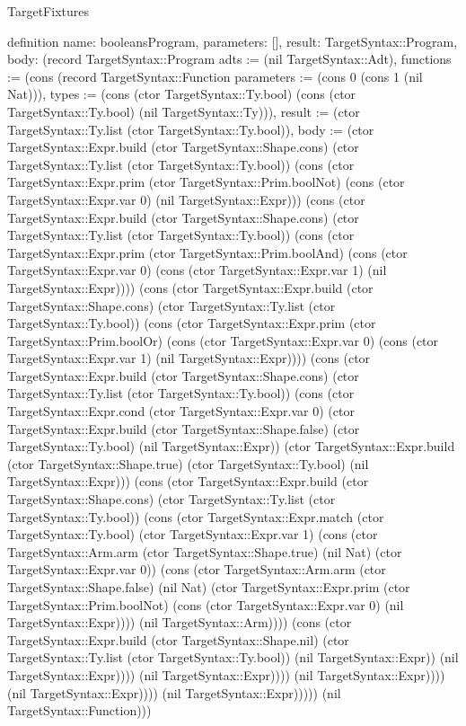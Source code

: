 \begin{lexlean}{TargetFixtures}
\begin{semanticmodule}
definition{
  name: booleansProgram,
  parameters: [],
  result: TargetSyntax::Program,
  body: (record TargetSyntax::Program {adts := (nil TargetSyntax::Adt), functions := (cons (record TargetSyntax::Function {parameters := (cons 0 (cons 1 (nil Nat))), types := (cons (ctor TargetSyntax::Ty.bool) (cons (ctor TargetSyntax::Ty.bool) (nil TargetSyntax::Ty))), result := (ctor TargetSyntax::Ty.list (ctor TargetSyntax::Ty.bool)), body := (ctor TargetSyntax::Expr.build (ctor TargetSyntax::Shape.cons) (ctor TargetSyntax::Ty.list (ctor TargetSyntax::Ty.bool)) (cons (ctor TargetSyntax::Expr.prim (ctor TargetSyntax::Prim.boolNot) (cons (ctor TargetSyntax::Expr.var 0) (nil TargetSyntax::Expr))) (cons (ctor TargetSyntax::Expr.build (ctor TargetSyntax::Shape.cons) (ctor TargetSyntax::Ty.list (ctor TargetSyntax::Ty.bool)) (cons (ctor TargetSyntax::Expr.prim (ctor TargetSyntax::Prim.boolAnd) (cons (ctor TargetSyntax::Expr.var 0) (cons (ctor TargetSyntax::Expr.var 1) (nil TargetSyntax::Expr)))) (cons (ctor TargetSyntax::Expr.build (ctor TargetSyntax::Shape.cons) (ctor TargetSyntax::Ty.list (ctor TargetSyntax::Ty.bool)) (cons (ctor TargetSyntax::Expr.prim (ctor TargetSyntax::Prim.boolOr) (cons (ctor TargetSyntax::Expr.var 0) (cons (ctor TargetSyntax::Expr.var 1) (nil TargetSyntax::Expr)))) (cons (ctor TargetSyntax::Expr.build (ctor TargetSyntax::Shape.cons) (ctor TargetSyntax::Ty.list (ctor TargetSyntax::Ty.bool)) (cons (ctor TargetSyntax::Expr.cond (ctor TargetSyntax::Expr.var 0) (ctor TargetSyntax::Expr.build (ctor TargetSyntax::Shape.false) (ctor TargetSyntax::Ty.bool) (nil TargetSyntax::Expr)) (ctor TargetSyntax::Expr.build (ctor TargetSyntax::Shape.true) (ctor TargetSyntax::Ty.bool) (nil TargetSyntax::Expr))) (cons (ctor TargetSyntax::Expr.build (ctor TargetSyntax::Shape.cons) (ctor TargetSyntax::Ty.list (ctor TargetSyntax::Ty.bool)) (cons (ctor TargetSyntax::Expr.match (ctor TargetSyntax::Ty.bool) (ctor TargetSyntax::Expr.var 1) (cons (ctor TargetSyntax::Arm.arm (ctor TargetSyntax::Shape.true) (nil Nat) (ctor TargetSyntax::Expr.var 0)) (cons (ctor TargetSyntax::Arm.arm (ctor TargetSyntax::Shape.false) (nil Nat) (ctor TargetSyntax::Expr.prim (ctor TargetSyntax::Prim.boolNot) (cons (ctor TargetSyntax::Expr.var 0) (nil TargetSyntax::Expr)))) (nil TargetSyntax::Arm)))) (cons (ctor TargetSyntax::Expr.build (ctor TargetSyntax::Shape.nil) (ctor TargetSyntax::Ty.list (ctor TargetSyntax::Ty.bool)) (nil TargetSyntax::Expr)) (nil TargetSyntax::Expr)))) (nil TargetSyntax::Expr)))) (nil TargetSyntax::Expr)))) (nil TargetSyntax::Expr)))) (nil TargetSyntax::Expr))))}) (nil TargetSyntax::Function))})
}


\end{semanticmodule}
\end{lexlean}
